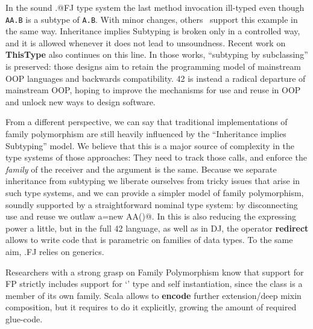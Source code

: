 In the sound \Q@.@FJ type system the last method invocation ill-typed even though \lstinline{AA.B} is a subtype of \lstinline{A.B}.
With minor changes, others~\cite{nystrom2006j,Ernst06,BruceEtAl98,IgarashiViroli07}
support this example in the same way.
Inheritance implies Subtyping is broken only in a controlled way, and it is allowed whenever it does not lead to unsoundness.
Recent work on {\bf ThisType} \cite{Saito:2009,ryu16ThisType}
also continues on this line.
In those works, ``subtyping by subclassing'' is preserved: those designs aim to retain the programming model of mainstream OOP languages and backwards compatibility. 42 is instead a radical departure of mainstream OOP, hoping to improve the mechanisms for use and reuse in OOP and unlock new ways to design software.

From a different perspective, we can say that traditional
implementations of family polymorphism are still heavily influenced by
the ``Inheritance implies Subtyping'' model.
We believe that this is a major source of complexity in the type
systems of those approaches:
They need to track those calls, and enforce the \emph{family} of the receiver and the argument is the same.
Because we separate inheritance from subtyping we liberate ourselves
from tricky issues that arise in such type systems, and we can
provide a simpler model of family polymorphism, soundly supported by 
a straightforward nominal type system:
by disconnecting use and reuse we outlaw \Q@A a=new AA()@.
In \name this is also reducing the expressing power a little, but
in the full 42 language, as well as in DJ, the operator \textbf{redirect} allows to write code that is parametric on families of data types.
To the same aim, .FJ relies on generics.

Researchers with a strong grasp on Family
Polymorphism know that support for FP strictly includes
support for `\Q@This@' type and self instantiation, since the
class is a member of its own family.
Scala allows to \textbf{encode} further extension/deep mixin composition,
but it requires to do it explicitly, growing the amount of required glue-code.





